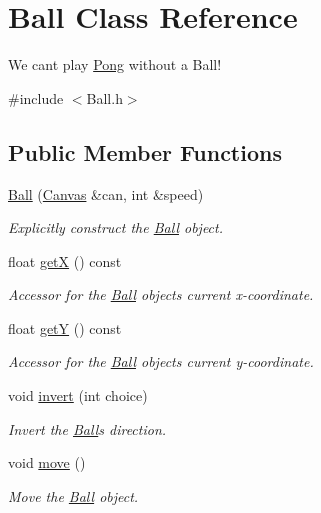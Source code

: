 \hypertarget{class_ball}{}\section{Ball Class Reference}
\label{class_ball}


We can\textquotesingle{}t play \hyperlink{class_pong}{Pong} without a Ball!  




{\ttfamily \#include $<$Ball.\+h$>$}

\subsection*{Public Member Functions}
\begin{DoxyCompactItemize}
\item 
\hyperlink{class_ball_a463d1350ad5150bf628d6c8f35f3ae64}{Ball} (\hyperlink{classtsgl_1_1_canvas}{Canvas} \&can, int \&speed)
\begin{DoxyCompactList}\small\item\em Explicitly construct the \hyperlink{class_ball}{Ball} object. \end{DoxyCompactList}\item 
float \hyperlink{class_ball_af438c37fd83fcf0f5808712d9b456320}{getX} () const
\begin{DoxyCompactList}\small\item\em Accessor for the \hyperlink{class_ball}{Ball} object\textquotesingle{}s current x-\/coordinate. \end{DoxyCompactList}\item 
float \hyperlink{class_ball_aeb4e2979fb20b91c9e23c1ee6b2897ae}{getY} () const
\begin{DoxyCompactList}\small\item\em Accessor for the \hyperlink{class_ball}{Ball} object\textquotesingle{}s current y-\/coordinate. \end{DoxyCompactList}\item 
void \hyperlink{class_ball_a478963d27b3814529c53ed0818f8ea9d}{invert} (int choice)
\begin{DoxyCompactList}\small\item\em Invert the \hyperlink{class_ball}{Ball}\textquotesingle{}s direction. \end{DoxyCompactList}\item 
void \hyperlink{class_ball_a05228e822d67b25baf715cf09c325494}{move} ()
\begin{DoxyCompactList}\small\item\em Move the \hyperlink{class_ball}{Ball} object. \end{DoxyCompactList}\item 

\end{DoxyCompactItemize}
